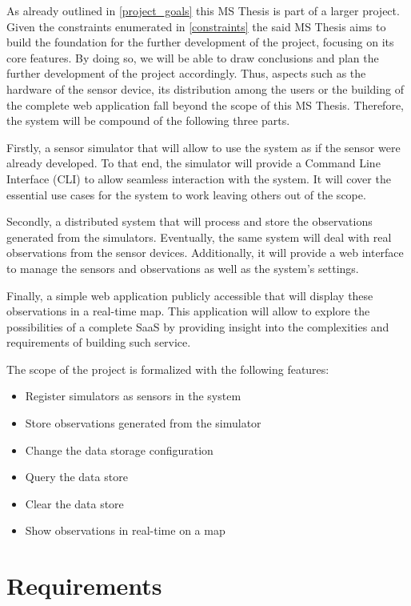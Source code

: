 As already outlined in \ref{project_goals} this MS Thesis is part of a larger project. Given the constraints enumerated in \ref{constraints} the said MS Thesis aims to build the foundation for the further development of the project, focusing on its core features. By doing so, we will be able to draw conclusions and plan the further development of the project accordingly. Thus, aspects such as the hardware of the sensor device, its distribution among the users or the building of the complete web application fall beyond the scope of this MS Thesis. Therefore, the system will be compound of the following three parts.

Firstly, a sensor simulator that will allow to use the system as if the sensor were already developed. To that end, the simulator will provide a Command Line Interface (CLI) to allow seamless interaction with the system. It will cover the essential use cases for the system to work leaving others out of the scope.

Secondly, a distributed system that will process and store the observations generated from the simulators. Eventually, the same system will deal with real observations from the sensor devices. Additionally, it will provide a web interface to manage the sensors and observations as well as the system's settings.

Finally, a simple web application publicly accessible that will display these observations in a real-time map. This application will allow to explore the possibilities of a complete SaaS by providing insight into the complexities and requirements of building such service.

The scope of the project is formalized with the following features:

\begin{itemize}
\item Register simulators as sensors in the system
\item Store observations generated from the simulator
\item Change the data storage configuration
\item Query the data store
\item Clear the data store
\item Show observations in real-time on a map
\end{itemize}

\section{Requirements}

